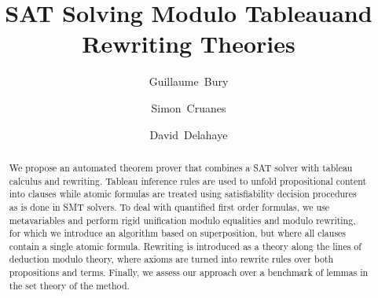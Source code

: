 \documentclass[orivec]{llncs}
\begin{document}
\title{SAT Solving Modulo Tableau\break{}and Rewriting Theories}

\author{Guillaume~Bury \and Simon~Cruanes \and
David~Delahaye}


\maketitle

\begin{abstract}
We propose an automated theorem prover that combines a SAT solver with tableau
calculus and rewriting. Tableau inference rules are used to unfold propositional
content into clauses while atomic formulas are treated using satisfiability
decision procedures as is done in SMT solvers. To deal with quantified first
order formulas, we use metavariables and perform rigid unification modulo
equalities and modulo rewriting, for which we introduce an algorithm based on
superposition, but where all clauses contain a single atomic formula. Rewriting
is introduced as a theory along the lines of deduction modulo theory, where axioms
are turned into rewrite rules over both propositions and terms.  Finally, we assess
our approach over a benchmark of lemmas in the set theory of the \bmth{} method.

\end{abstract}









\end{document}

